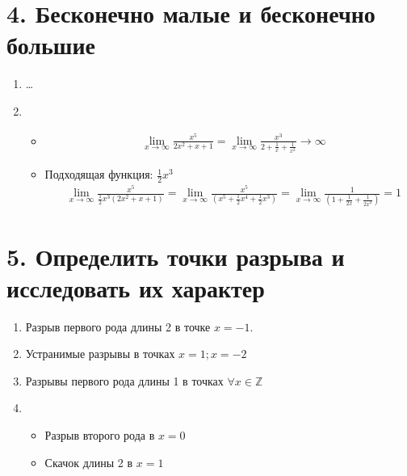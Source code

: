 \documentclass{article}
\begin{document}
\section*{4. Бесконечно малые и бесконечно большие}
\begin{enumerate}
    \item \dots
    \item 
    \begin{itemize}
        \item 
        \begin{align*}
        & \lim\limits_{x \to \infty}{\frac{
            x^{5}
        }{2 x^{2} + x + 1}} = \lim\limits_{x \to \infty}{\frac{x^{3}}{2 + \frac{1}{x} + \frac{1}{x^{2}}}} \to \infty
        \end{align*}
        \item Подходящая функция: $\frac{1}{2}x^{3}$
        \begin{align*}
            & \lim\limits_{x \to \infty}{\frac{x^{5}}{\frac{1}{2}x^{3}(2x^{2} + x + 1)}} = 
             \lim\limits_{x \to \infty}{\frac{x^{5}}{(x^{5} + \frac{1}{2}x^{4} + \frac{1}{2}x^{3})}} = 
             \lim\limits_{x \to \infty}{\frac{1}{(1 + \frac{1}{2x} + \frac{1}{2x^{2}})}} = 1  
        \end{align*}
    \end{itemize}
    
\end{enumerate}

\section*{5. Определить точки разрыва и исследовать их характер}
\begin{enumerate}
    \item Разрыв первого рода длины 2 в точке $x = -1$.
    \item Устранимые разрывы в точках $x = 1; x = -2$
    \item Разрывы первого рода длины 1 в точках $\forall x \in \mathbb{Z}$
    \item 
    \begin{itemize}
        \item Разрыв второго рода в $x = 0$
        \item Скачок длины 2 в $x = 1$
    \end{itemize}
\end{enumerate}
\end{document}
